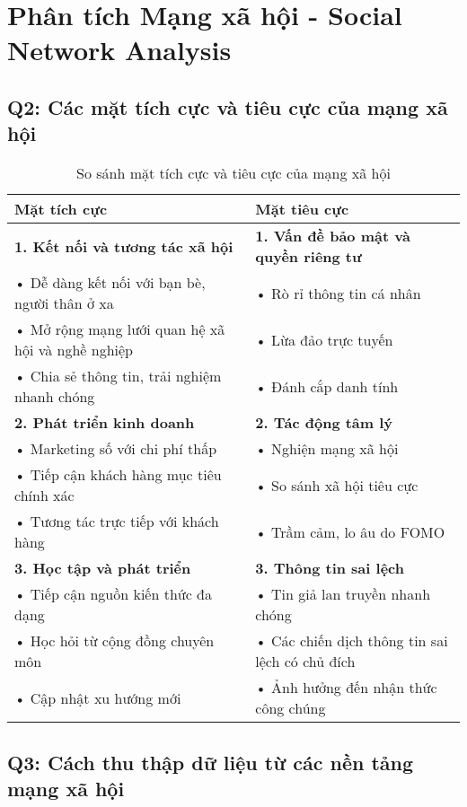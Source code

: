 \documentclass{article}
\begin{document}
\section*{Phân tích Mạng xã hội - Social Network Analysis}

\subsection*{Q2: Các mặt tích cực và tiêu cực của mạng xã hội}

\begin{table}[h!]
\begin{tabularx}{\textwidth}{|X|X|}
\hline
\textbf{Mặt tích cực} & \textbf{Mặt tiêu cực} \\
\hline
\textbf{1. Kết nối và tương tác xã hội} &
\textbf{1. Vấn đề bảo mật và quyền riêng tư} \\
• Dễ dàng kết nối với bạn bè, người thân ở xa &
• Rò rỉ thông tin cá nhân \\
• Mở rộng mạng lưới quan hệ xã hội và nghề nghiệp &
• Lừa đảo trực tuyến \\
• Chia sẻ thông tin, trải nghiệm nhanh chóng &
• Đánh cắp danh tính \\
\hline
\textbf{2. Phát triển kinh doanh} &
\textbf{2. Tác động tâm lý} \\
• Marketing số với chi phí thấp &
• Nghiện mạng xã hội \\
• Tiếp cận khách hàng mục tiêu chính xác &
• So sánh xã hội tiêu cực \\
• Tương tác trực tiếp với khách hàng &
• Trầm cảm, lo âu do FOMO \\
\hline
\textbf{3. Học tập và phát triển} &
\textbf{3. Thông tin sai lệch} \\
• Tiếp cận nguồn kiến thức đa dạng &
• Tin giả lan truyền nhanh chóng \\
• Học hỏi từ cộng đồng chuyên môn &
• Các chiến dịch thông tin sai lệch có chủ đích \\
• Cập nhật xu hướng mới &
• Ảnh hưởng đến nhận thức công chúng \\
\hline
\end{tabularx}
\caption{So sánh mặt tích cực và tiêu cực của mạng xã hội}
\end{table}

\subsection*{Q3: Cách thu thập dữ liệu từ các nền tảng mạng xã hội}
\end{document}
